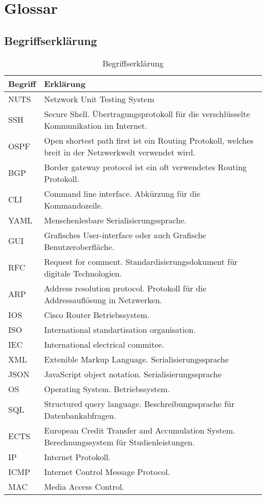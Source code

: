 \documentclass[]{subfiles}
\begin{document}
\section*{Glossar}

\subsection*{Begriffserklärung}

    \begin{table}[h!]
        \begin{tabularx}{\textwidth}{lX}
            \toprule
            Begriff & Erklärung \\
            \midrule
            NUTS & Netzwork Unit Testing System \\
            SSH & Secure Shell. Übertragungsprotokoll für die verschlüsselte Kommunikation im Internet. \\
            OSPF & Open shortest path first ist ein Routing Protokoll, welches breit in der Netzwerkwelt verwendet wird. \\
            BGP & Border gateway protocol ist ein oft verwendetes Routing Protokoll. \\
            CLI & Command line interface. Abkürzung für die Kommandozeile. \\
            YAML & Menschenlesbare Serialisierungssprache. \\
            GUI & Grafisches User-interface oder auch Grafische Benutzeroberfläche. \\
            RFC & Request for comment. Standardisierungsdokument für digitale Technologien. \\
            ARP & Address resolution protocol. Protokoll für die Addressauflösung in Netzwerken. \\
            IOS & Cisco Router Betriebssystem. \\
            ISO & International standartisation organisation. \\
            IEC & International electrical commitee. \\
            XML & Extenible Markup Language. Serialisierungssprache \\
            JSON & JavaScript object notation. Serialisierungssprache \\
            OS & Operating System. Betriebssystem. \\
            SQL & Structured query language. Beschreibungssprache für Datenbankabfragen. \\
            ECTS & European Credit Transfer and Accumulation System. Berechnungssystem für Studienleistungen. \\
            IP & Internet Protokoll. \\
            ICMP & Internet Control Message Protocol. \\
            MAC & Media Access Control. \\
            \bottomrule
        \end{tabularx}
        \caption{Begriffserklärung}
    \end{table}
\end{document}
